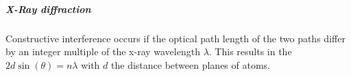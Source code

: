 
\subparagraph{X-Ray diffraction}
Constructive interference occurs if the optical path
length of the two paths differ by an integer multiple of the x-ray wavelength
$\lambda$. This results in the  $2 d \sin(\theta) = n \lambda$ with
$d$ the distance between planes of atoms. 


